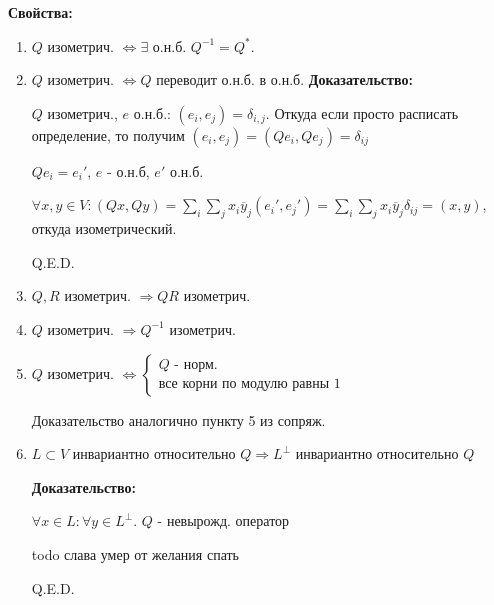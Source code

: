 \textbf{Свойства:}

\begin{enumerate}
    \item $Q$ изометрич. $\Leftrightarrow \exists $ о.н.б. $Q^{-1}=Q^*$.
    \item $Q$ изометрич. $\Leftrightarrow Q$ переводит о.н.б. в о.н.б.
    \textbf{Доказательство:}

     $Q$ изометрич., $e$ о.н.б.: $(e_i,e_j) = \delta_{i,j}$. Откуда если просто расписать определение, то получим $(e_i,e_j) = (Q e_i,Qe_j) = \delta_{ij}$

     $Qe_i = e_i'$, $e$ - о.н.б, $e'$ о.н.б.

    $\forall x,y \in V: (Qx,Qy) = \sum\limits_{i}\sum\limits_{j}x_i\overline{y}_j (e_i',e_j') = \sum\limits_{i}\sum\limits_{j}x_i\overline{y}_j \delta_{ij}= (x,y)$, откуда изометрический.

    \hfill Q.E.D.

    \item $Q,R$ изометрич. $\Rightarrow QR$ изометрич.
    \item $Q$ изометрич. $\Rightarrow Q^{-1}$ изометрич.
    \item $Q$ изометрич. $\Leftrightarrow \begin{cases}
        Q \text{ - норм.}\\
        \text{все корни по модулю равны 1}
    \end{cases}$

    Доказательство аналогично пункту 5 из сопряж.
    \item  $L \subset V$ инвариантно относительно $Q \Rightarrow L^\perp$ инвариантно относительно $Q$

    \textbf{Доказательство:}

    $\forall x\in L: \forall y \in L^\perp$. $Q$ - невырожд. оператор

    todo слава умер от желания спать
    

    \hfill Q.E.D.
    
\end{enumerate}

